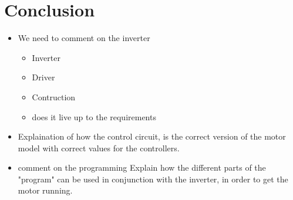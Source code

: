 \section{Conclusion}

\begin{itemize}
\item We need to comment on the inverter
    \begin{itemize}
        \item Inverter
        \item Driver
        \item Contruction
        \item does it live up to the requirements
    \end{itemize}
\item Explaination of how the control circuit, is the correct version of the motor model with correct values for the controllers.
\item comment on the programming
Explain how the different parts of the "program" can be used in conjunction with the inverter, in order to get the motor running.

\end{itemize}